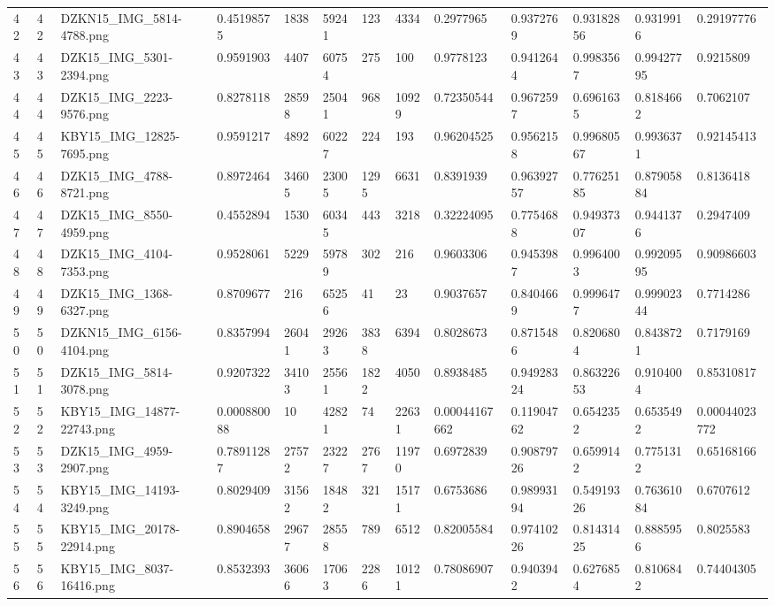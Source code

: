 \documentclass[11pt, a4paper, twoside]{report}
\begin{document}
\begin{longtable}[c]{@{}lllllllllllll@{}}
42 & 42 & DZKN15\_IMG\_5814-4788.png & 0.45198575 & 1838 & 59241 & 123 & 4334 & 0.2977965 & 0.9372769 & 0.93182856 & 0.9319916 & 0.29197776 \\
43 & 43 & DZK15\_IMG\_5301-2394.png & 0.9591903 & 4407 & 60754 & 275 & 100 & 0.9778123 & 0.9412644 & 0.9983567 & 0.99427795 & 0.9215809 \\
44 & 44 & DZK15\_IMG\_2223-9576.png & 0.8278118 & 28598 & 25041 & 968 & 10929 & 0.72350544 & 0.9672597 & 0.6961635 & 0.8184662 & 0.7062107 \\
45 & 45 & KBY15\_IMG\_12825-7695.png & 0.9591217 & 4892 & 60227 & 224 & 193 & 0.96204525 & 0.9562158 & 0.99680567 & 0.9936371 & 0.92145413 \\
46 & 46 & DZK15\_IMG\_4788-8721.png & 0.8972464 & 34605 & 23005 & 1295 & 6631 & 0.8391939 & 0.96392757 & 0.77625185 & 0.87905884 & 0.8136418 \\
47 & 47 & DZK15\_IMG\_8550-4959.png & 0.4552894 & 1530 & 60345 & 443 & 3218 & 0.32224095 & 0.7754688 & 0.94937307 & 0.9441376 & 0.2947409 \\
48 & 48 & DZK15\_IMG\_4104-7353.png & 0.9528061 & 5229 & 59789 & 302 & 216 & 0.9603306 & 0.9453987 & 0.9964003 & 0.99209595 & 0.90986603 \\
49 & 49 & DZK15\_IMG\_1368-6327.png & 0.8709677 & 216 & 65256 & 41 & 23 & 0.9037657 & 0.8404669 & 0.9996477 & 0.99902344 & 0.7714286 \\
50 & 50 & DZKN15\_IMG\_6156-4104.png & 0.8357994 & 26041 & 29263 & 3838 & 6394 & 0.8028673 & 0.8715486 & 0.8206804 & 0.8438721 & 0.7179169 \\
51 & 51 & DZK15\_IMG\_5814-3078.png & 0.9207322 & 34103 & 25561 & 1822 & 4050 & 0.8938485 & 0.94928324 & 0.86322653 & 0.9104004 & 0.85310817 \\
52 & 52 & KBY15\_IMG\_14877-22743.png & 0.000880088 & 10 & 42821 & 74 & 22631 & 0.00044167662 & 0.11904762 & 0.6542352 & 0.6535492 & 0.00044023772 \\
53 & 53 & DZK15\_IMG\_4959-2907.png & 0.78911287 & 27572 & 23227 & 2767 & 11970 & 0.6972839 & 0.90879726 & 0.6599142 & 0.7751312 & 0.65168166 \\
54 & 54 & KBY15\_IMG\_14193-3249.png & 0.8029409 & 31562 & 18482 & 321 & 15171 & 0.6753686 & 0.98993194 & 0.54919326 & 0.76361084 & 0.6707612 \\
55 & 55 & KBY15\_IMG\_20178-22914.png & 0.8904658 & 29677 & 28558 & 789 & 6512 & 0.82005584 & 0.97410226 & 0.81431425 & 0.8885956 & 0.8025583 \\
56 & 56 & KBY15\_IMG\_8037-16416.png & 0.8532393 & 36066 & 17063 & 2286 & 10121 & 0.78086907 & 0.9403942 & 0.6276854 & 0.8106842 & 0.74404305 \\

\end{longtable}
\end{document}
